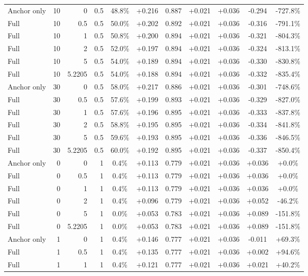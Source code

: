 \begin{table}[htbp]
\begin{tabular}{lrrrccccccc}
Anchor only & 10 & 0 & 0.5 & 48.8\% & +0.216 & 0.887 & +0.021 & +0.036 & -0.294 & -727.8\% \\
Full & 10 & 0.5 & 0.5 & 50.0\% & +0.202 & 0.892 & +0.021 & +0.036 & -0.316 & -791.1\% \\
Full & 10 & 1 & 0.5 & 50.8\% & +0.200 & 0.894 & +0.021 & +0.036 & -0.321 & -804.3\% \\
Full & 10 & 2 & 0.5 & 52.0\% & +0.197 & 0.894 & +0.021 & +0.036 & -0.324 & -813.1\% \\
Full & 10 & 5 & 0.5 & 54.0\% & +0.189 & 0.894 & +0.021 & +0.036 & -0.330 & -830.8\% \\
Full & 10 & 5.2205 & 0.5 & 54.0\% & +0.188 & 0.894 & +0.021 & +0.036 & -0.332 & -835.4\% \\
Anchor only & 30 & 0 & 0.5 & 58.0\% & +0.217 & 0.886 & +0.021 & +0.036 & -0.301 & -748.6\% \\
Full & 30 & 0.5 & 0.5 & 57.6\% & +0.199 & 0.893 & +0.021 & +0.036 & -0.329 & -827.0\% \\
Full & 30 & 1 & 0.5 & 57.6\% & +0.196 & 0.895 & +0.021 & +0.036 & -0.333 & -837.8\% \\
Full & 30 & 2 & 0.5 & 58.8\% & +0.195 & 0.895 & +0.021 & +0.036 & -0.334 & -841.8\% \\
Full & 30 & 5 & 0.5 & 59.6\% & +0.193 & 0.895 & +0.021 & +0.036 & -0.336 & -846.5\% \\
Full & 30 & 5.2205 & 0.5 & 60.0\% & +0.192 & 0.895 & +0.021 & +0.036 & -0.337 & -850.4\% \\
Anchor only & 0 & 0 & 1 & 0.4\% & +0.113 & 0.779 & +0.021 & +0.036 & +0.036 & +0.0\% \\
Full & 0 & 0.5 & 1 & 0.4\% & +0.113 & 0.779 & +0.021 & +0.036 & +0.036 & +0.0\% \\
Full & 0 & 1 & 1 & 0.4\% & +0.113 & 0.779 & +0.021 & +0.036 & +0.036 & +0.0\% \\
Full & 0 & 2 & 1 & 0.4\% & +0.096 & 0.779 & +0.021 & +0.036 & +0.052 & -46.2\% \\
Full & 0 & 5 & 1 & 0.0\% & +0.053 & 0.783 & +0.021 & +0.036 & +0.089 & -151.8\% \\
Full & 0 & 5.2205 & 1 & 0.0\% & +0.053 & 0.783 & +0.021 & +0.036 & +0.089 & -151.8\% \\
Anchor only & 1 & 0 & 1 & 0.4\% & +0.146 & 0.777 & +0.021 & +0.036 & -0.011 & +69.3\% \\
Full & 1 & 0.5 & 1 & 0.4\% & +0.135 & 0.777 & +0.021 & +0.036 & +0.002 & +94.6\% \\
Full & 1 & 1 & 1 & 0.4\% & +0.121 & 0.777 & +0.021 & +0.036 & +0.021 & +40.2\% \\

\end{tabular}
\end{table}
